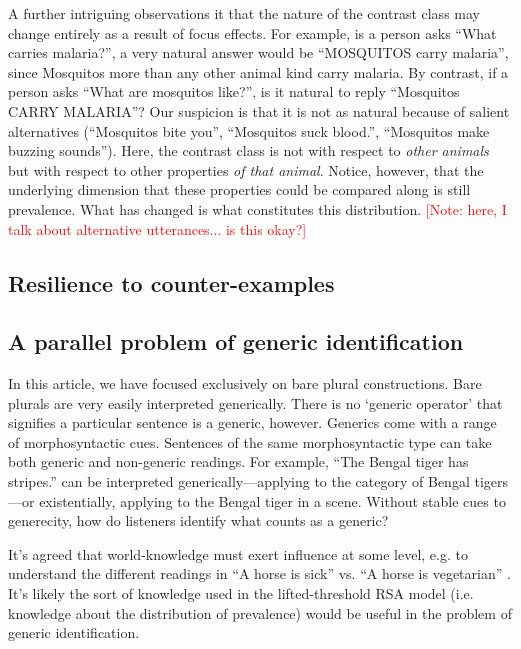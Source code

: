 \documentclass[10pt,letterpaper]{article}
\newcommand{\red}[1]{\textcolor{Red}{#1}}
\begin{document}
A further intriguing observations it that the nature of the contrast class may change entirely as a result of focus effects. For example, is a person asks ``What carries malaria?'', a very natural answer would be ``MOSQUITOS carry malaria'', since Mosquitos more than any other animal kind carry malaria. By contrast, if a person asks ``What are mosquitos like?'', is it natural to reply ``Mosquitos CARRY MALARIA''? Our suspicion is that it is not as natural because of salient alternatives (``Mosquitos bite you'', ``Mosquitos suck blood.'', ``Mosquitos make buzzing sounds''). Here, the contrast class is not with respect to \emph{other animals} but with respect to other properties \emph{of that animal}. Notice, however, that the underlying dimension that these properties could be compared along is still prevalence. What has changed is what constitutes this distribution. \red{[Note: here, I talk about alternative utterances... is this okay?]}

\subsection{Resilience to counter-examples}

\subsection{A parallel problem of generic identification}

In this article, we have focused exclusively on bare plural constructions. Bare plurals are very easily interpreted generically.  There is no `generic operator' that signifies a particular sentence is a generic, however.  Generics come with a range of morphosyntactic cues. Sentences of the same morphosyntactic type can take both generic and non-generic readings. For example, ``The Bengal tiger has stripes.'' can be interpreted generically---applying to the category of Bengal tigers---or existentially, applying to the Bengal tiger in a scene. Without stable cues to generecity, how do listeners identify what counts as a generic?

It's agreed that world-knowledge must exert influence at some level, e.g. to understand the different readings in ``A horse is sick'' vs. ``A horse is vegetarian'' \cite{Gelman2004}. It's likely the sort of knowledge used in the lifted-threshold RSA model (i.e. knowledge about the distribution of prevalence) would be useful in the problem of generic identification. 

\end{document}
